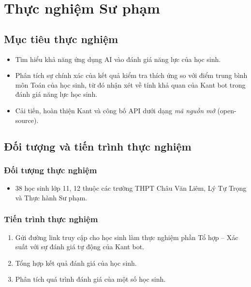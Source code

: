 \chapter{Thực nghiệm Sư phạm}

\section{Mục tiêu thực nghiệm}\begin{itemize}
	\item Tìm hiểu khả năng ứng dụng AI vào đánh giá năng lực của học sinh.
	\item Phân tích sự chính xác của kết quả kiểm tra thích ứng so với điểm trung bình môn Toán của học sinh, từ đó nhận xét về tính khả quan của Kant bot trong đánh giá năng lực học sinh.
	\item Cải tiến, hoàn thiện Kant và công bố API dưới dạng \textit{mã nguồn mở} (open-source).
\end{itemize}

\section{Đối tượng và tiến trình thực nghiệm}
\subsection{Đối tượng thực nghiệm}\begin{itemize}
	\item 38 học sinh lớp 11, 12 thuộc các trường THPT Châu Văn Liêm, Lý Tự Trọng và Thực hành Sư phạm.
\end{itemize}

\subsection{Tiến trình thực nghiệm}
\begin{enumerate}[label=\textbf{Giai đoạn \arabic*.},align=left,left=0cm..0cm,itemindent=*]
	\item Gửi đường link truy cập cho học sinh làm thực nghiệm phần Tổ hợp – Xác suất với sự đánh giá tự động của Kant bot.\par
	\item Tổng hợp kết quả đánh giá của học sinh.
	\item Phân tích quá trình đánh giá của một số học sinh.
\end{enumerate}

